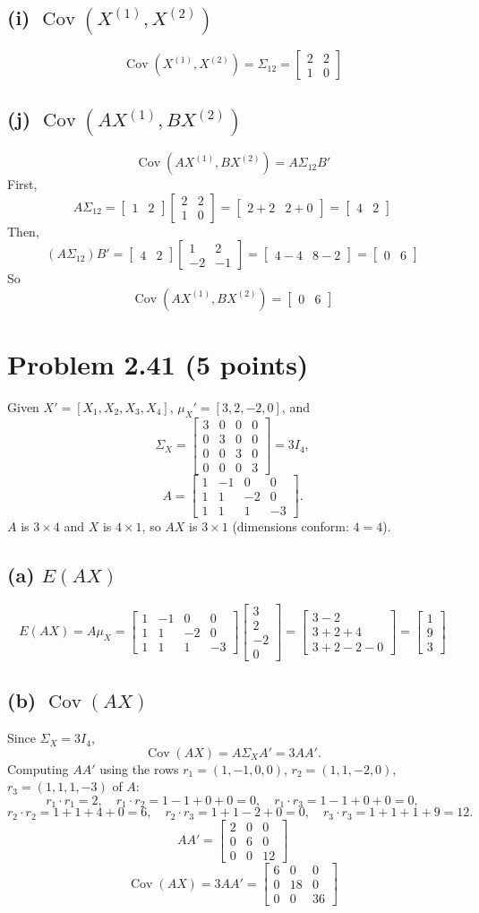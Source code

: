 \documentclass[11pt]{article}
\newcommand{\mat}[1]{\begin{bmatrix} #1 \end{bmatrix}}
\begin{document}
\subsection*{(i) $\operatorname{Cov}(X^{(1)},X^{(2)})$}
\[
\operatorname{Cov}(X^{(1)},X^{(2)}) = \Sigma_{12} = \mat{2&2\\1&0}
\]

\subsection*{(j) $\operatorname{Cov}(AX^{(1)},BX^{(2)})$}
\[
\operatorname{Cov}(AX^{(1)},BX^{(2)}) = A\Sigma_{12}B'
\]
First,
\[
A\Sigma_{12} = \mat{1&2}\mat{2&2\\1&0} = \mat{2+2 & 2+0} = \mat{4&2}
\]
Then,
\[
(A\Sigma_{12})B' = \mat{4&2}\mat{1&2\\-2&-1} = \mat{4-4 & 8-2} = \mat{0&6}
\]
So
\[
\operatorname{Cov}(AX^{(1)},BX^{(2)}) = \mat{0&6}
\]

\section*{Problem 2.41 (5 points)}

Given $X' = [X_1,X_2,X_3,X_4]$, $\mu_X' = [3,2,-2,0]$, and
\[
\Sigma_X = \mat{3&0&0&0\\0&3&0&0\\0&0&3&0\\0&0&0&3} = 3I_4,
\]
\[
A = \mat{1&-1&0&0\\1&1&-2&0\\1&1&1&-3}.
\]
$A$ is $3\times4$ and $X$ is $4\times1$, so $AX$ is $3\times1$ (dimensions conform: $4=4$).

\subsection*{(a) $E(AX)$}
\[
E(AX) = A\mu_X = \mat{1&-1&0&0\\1&1&-2&0\\1&1&1&-3}\mat{3\\2\\-2\\0}
= \mat{3-2\\3+2+4\\3+2-2-0} = \mat{1\\9\\3}
\]

\subsection*{(b) $\operatorname{Cov}(AX)$}
Since $\Sigma_X = 3I_4$,
\[
\operatorname{Cov}(AX) = A\Sigma_X A' = 3AA'.
\]
Computing $AA'$ using the rows $r_1=(1,-1,0,0)$, $r_2=(1,1,-2,0)$, $r_3=(1,1,1,-3)$ of $A$:
\[
r_1\cdot r_1 = 2,\quad r_1\cdot r_2 = 1-1+0+0=0,\quad r_1\cdot r_3 = 1-1+0+0=0,
\]
\[
r_2\cdot r_2 = 1+1+4+0=6,\quad r_2\cdot r_3 = 1+1-2+0=0,\quad r_3\cdot r_3 = 1+1+1+9=12.
\]
\[
AA' = \mat{2&0&0\\0&6&0\\0&0&12}
\]
\[
\operatorname{Cov}(AX) = 3AA' = \mat{6&0&0\\0&18&0\\0&0&36}
\]
\end{document}
